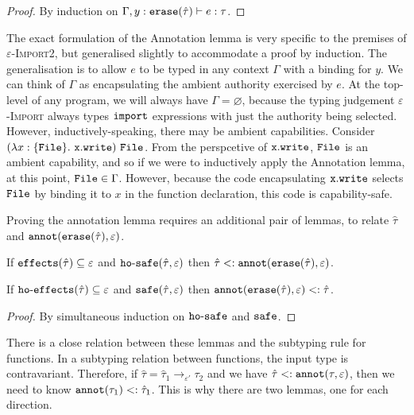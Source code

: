 \begin{proof}
By induction on $\Gamma, y: \mathtt{erase}(\hat \tau) \vdash e: \tau$.
\end{proof}

\noindent
The exact formulation of the Annotation lemma is very specific to the premises of \textsc{$\varepsilon$-Import2}, but generalised slightly to accommodate a proof by induction. The generalisation is to allow $e$ to be typed in any context $\Gamma$ with a binding for $y$. We can think of $\Gamma$ as encapsulating the ambient authority exercised by $e$. At the top-level of any program, we will always have $\Gamma = \varnothing$, because the typing judgement \textsc{$\varepsilon$-Import} always types $\mathtt{import}$ expressions with just the authority being selected. However, inductively-speaking, there may be ambient capabilities. Consider $(\lambda x: \{ \mathtt{File} \}.~\mathtt{x.write})~\mathtt{File}$. From the perspcetive of $\mathtt{x.write}$, $\mathtt{File}$ is an ambient capability, and so if we were to inductively apply the Annotation lemma, at this point, $\mathtt{File} \in \Gamma$. However, because the code encapsulating $\mathtt{x.write}$ selects $\mathtt{File}$ by binding it to $x$ in the function declaration, this code is capability-safe.

Proving the annotation lemma requires an additional pair of lemmas, to relate $\hat \tau$ and $\mathtt{annot}(\mathtt{erase}(\hat \tau), \varepsilon)$.

\begin{lemma}
If $\mathtt{effects}(\hat \tau) \subseteq \varepsilon$ and $\mathtt{ho \hbox{-} safe}(\hat \tau, \varepsilon)$ then $\hat \tau <: \mathtt{annot}(\mathtt{erase}(\hat \tau), \varepsilon)$.
\end{lemma}

\begin{lemma}
If $\mathtt{ho \hbox{-} effects}(\hat \tau) \subseteq \varepsilon$ and $\mathtt{safe}(\hat \tau, \varepsilon)$ then $\mathtt{annot(erase}(\hat \tau), \varepsilon) <: \hat \tau$.
\end{lemma}

\begin{proof}
By simultaneous induction on $\mathtt{ho \hbox{-} safe}$ and $\mathtt{safe}$.
\end{proof}

\noindent
There is a close relation between these lemmas and the subtyping rule for functions. In a subtyping relation between functions, the input type is contravariant. Therefore, if $\hat \tau = \hat \tau_1 \rightarrow_{\varepsilon'} \tau_2$ and we have $\hat \tau <: \mathtt{annot}(\tau, \varepsilon)$, then we need to know $\mathtt{annot}(\tau_1) <: \hat \tau_1$. This is why there are two lemmas, one for each direction.

